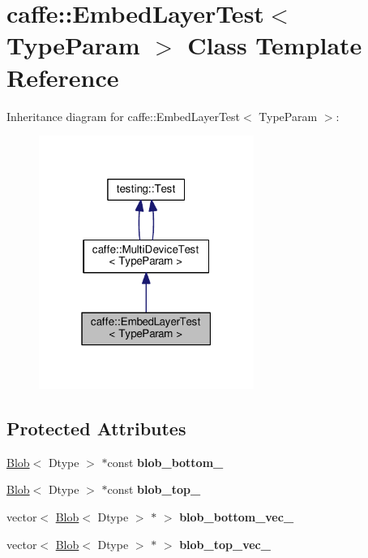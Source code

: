\hypertarget{classcaffe_1_1_embed_layer_test}{}\section{caffe\+:\+:Embed\+Layer\+Test$<$ Type\+Param $>$ Class Template Reference}
\label{classcaffe_1_1_embed_layer_test}


Inheritance diagram for caffe\+:\+:Embed\+Layer\+Test$<$ Type\+Param $>$\+:
\nopagebreak
\begin{figure}[H]
\begin{center}
\leavevmode
\includegraphics[width=199pt]{classcaffe_1_1_embed_layer_test__inherit__graph}
\end{center}
\end{figure}
\subsection*{Protected Attributes}
\begin{DoxyCompactItemize}
\item 
\mbox{\label{classcaffe_1_1_embed_layer_test_ab1f0810f526937de1a726b88903109f4}} 
\mbox{\hyperlink{classcaffe_1_1_blob}{Blob}}$<$ Dtype $>$ $\ast$const {\bfseries blob\+\_\+bottom\+\_\+}
\item 
\mbox{\label{classcaffe_1_1_embed_layer_test_ab1615c54bb37224e7d55dd04ef4a1d12}} 
\mbox{\hyperlink{classcaffe_1_1_blob}{Blob}}$<$ Dtype $>$ $\ast$const {\bfseries blob\+\_\+top\+\_\+}
\item 
\mbox{\label{classcaffe_1_1_embed_layer_test_a56fc53dca52b67a766b61a98eb7434bb}} 
vector$<$ \mbox{\hyperlink{classcaffe_1_1_blob}{Blob}}$<$ Dtype $>$ $\ast$ $>$ {\bfseries blob\+\_\+bottom\+\_\+vec\+\_\+}
\item 
\mbox{\label{classcaffe_1_1_embed_layer_test_ab3f2818c3396feb45d440baf755e954d}} 
vector$<$ \mbox{\hyperlink{classcaffe_1_1_blob}{Blob}}$<$ Dtype $>$ $\ast$ $>$ {\bfseries blob\+\_\+top\+\_\+vec\+\_\+}
\end{DoxyCompactItemize}
